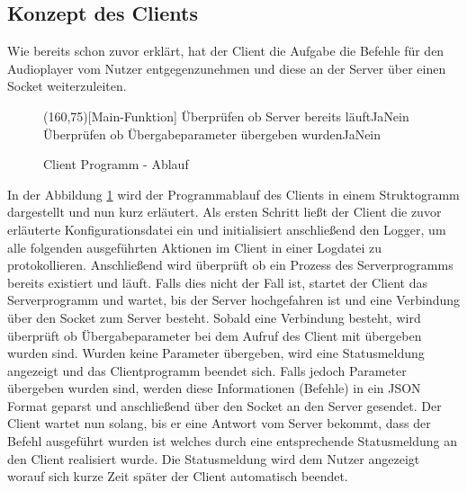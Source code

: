 \subsection{Konzept des Clients}
Wie bereits schon zuvor erklärt, hat der Client die Aufgabe die Befehle für den
Audioplayer vom Nutzer entgegenzunehmen und diese an der Server über einen
Socket weiterzuleiten.

\begin{figure}[H]
    \begin{struktogramm}(160,75)[Main-Funktion] 
         {Überprüfen ob Server bereits läuft}{Ja}{Nein} 
        	\change
        \ifend
         {Überprüfen ob Übergabeparameter übergeben wurden}{Ja}{Nein} 
            \whileend
            \change
        \ifend
    \end{struktogramm} 
\caption{Client Programm - Ablauf} 
\label{lst:client_ablauf} 
\end{figure}

In der Abbildung \ref{lst:client_ablauf} wird der Programmablauf des Clients in
einem Struktogramm dargestellt und nun kurz erläutert. Als ersten Schritt ließt
der Client die zuvor erläuterte Konfigurationsdatei ein und initialisiert
anschließend den Logger, um alle folgenden ausgeführten Aktionen im Client in
einer Logdatei zu protokollieren. Anschließend wird überprüft ob ein Prozess
des Serverprogramms bereits existiert und läuft. Falls dies nicht der Fall ist,
startet der Client das Serverprogramm und wartet, bis der Server hochgefahren
ist und eine Verbindung über den Socket zum Server besteht. Sobald eine
Verbindung besteht, wird überprüft ob Übergabeparameter bei dem Aufruf des
Client mit übergeben wurden sind. Wurden keine Parameter übergeben, wird eine
Statusmeldung angezeigt und das Clientprogramm beendet sich. Falls jedoch
Parameter übergeben wurden sind, werden diese Informationen (Befehle) in ein
\ac{JSON} Format geparst und anschließend über den Socket an den Server
gesendet. Der Client wartet nun solang, bis er eine Antwort vom Server bekommt,
dass der Befehl ausgeführt wurden ist welches durch eine entsprechende
Statusmeldung an den Client realisiert wurde. Die Statusmeldung wird dem Nutzer
angezeigt worauf sich kurze Zeit später der Client automatisch beendet.

